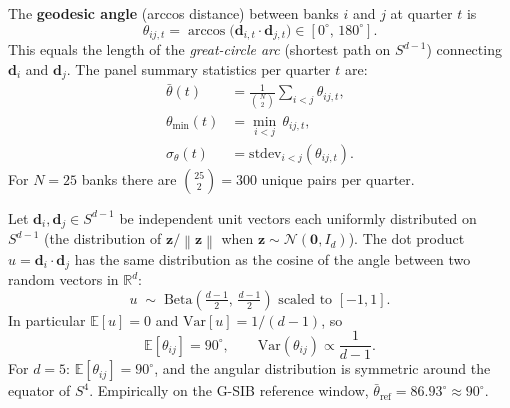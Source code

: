 \documentclass[journal]{IEEEtran}
\newcommand{\R}{\mathbb{R}}
\newcommand{\E}{\mathbb{E}}
\newcommand{\norm}[1]{\left\lVert#1\right\rVert}
\begin{document}
\begin{definition}
\label{def:theta}
The \textbf{geodesic angle} (arccos distance) between banks $i$ and $j$
at quarter $t$ is
\begin{equation}
  \theta_{ij,t} = \arccos\!\bigl(\mathbf{d}_{i,t} \cdot \mathbf{d}_{j,t}\bigr)
                 \in [0^\circ,\, 180^\circ].
  \label{eq:theta_ij}
\end{equation}
This equals the length of the \emph{great-circle arc} (shortest path on
$S^{d-1}$) connecting $\mathbf{d}_i$ and $\mathbf{d}_j$.
The panel summary statistics per quarter $t$ are:
\begin{align}
  \bar\theta(t) &= \frac{1}{\binom{N}{2}}
    \sum_{i < j} \theta_{ij,t}, \label{eq:theta_mean}\\
  \theta_{\min}(t) &= \min_{i<j}\,\theta_{ij,t}, \label{eq:theta_min}\\
  \sigma_\theta(t) &= \mathrm{stdev}_{i<j}(\theta_{ij,t}). \label{eq:theta_std}
\end{align}
For $N=25$ banks there are $\binom{25}{2}=300$ unique pairs per quarter.
\end{definition}

\begin{theorem}
\label{thm:theta_h0}
Let $\mathbf{d}_i, \mathbf{d}_j \in S^{d-1}$ be independent unit vectors
each uniformly distributed on $S^{d-1}$ (the distribution of
$\mathbf{z}/\norm{\mathbf{z}}$ when $\mathbf{z}\sim\mathcal{N}(\mathbf{0},I_d)$).
The dot product $u = \mathbf{d}_i \cdot \mathbf{d}_j$ has the same distribution
as the cosine of the angle between two random vectors in $\R^d$:
\begin{equation}
  u \;\sim\; \mathrm{Beta}\!\left(\tfrac{d-1}{2},\,\tfrac{d-1}{2}\right)
  \text{ scaled to } [-1,1].
  \label{eq:beta_dot}
\end{equation}
In particular $\E[u]=0$ and $\mathrm{Var}[u]=1/(d-1)$, so
\begin{equation}
  \E[\theta_{ij}] = 90^\circ, \qquad
  \mathrm{Var}(\theta_{ij}) \propto \frac{1}{d-1}.
  \label{eq:theta_expect}
\end{equation}
For $d=5$: $\E[\theta_{ij}]=90^\circ$, and the angular distribution is
symmetric around the equator of $S^4$.  Empirically on the G-SIB reference
window, $\bar\theta_{\mathrm{ref}} = 86.93^\circ \approx 90^\circ$.
\end{theorem}
\end{document}
